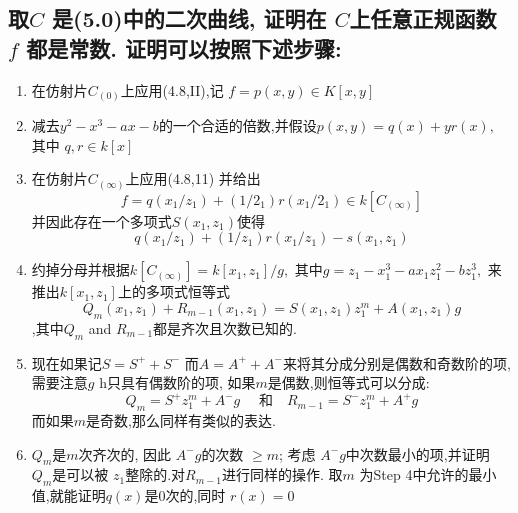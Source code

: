 \documentclass[UTF8]{book}
\begin{document}
		\subsection{取$C$ 是(5.0)中的二次曲线, 证明在 $C$上任意正规函数 $f$ 都是常数. 证明可以按照下述步骤:}
			\begin{enumerate}[Step 1]
			\item 在仿射片$C_{(0)}$上应用(4.8,II),记 $f=p(x, y) \in K [x, y]$ 
			\item 减去$y^{2}-x^{3}-a x-b$的一个合适的倍数,并假设$p(x, y)=q(x)+y r(x),$ 其中 $q, r \in k[x]$
			\item 在仿射片$C_{(\infty)}$上应用(4.8,11) 并给出
			\begin{equation*}
			f=q\left(x_{1} / z_{1}\right)+\left(1 / 2_{1}\right) r\left(x_{1} / 2_{1}\right) \in k\left[C_{(\infty)}\right]
			\end{equation*}
			并因此存在一个多项式$S\left(x_{1}, z_{1}\right)$使得
			\begin{equation*}
			q\left(x_{1} / z_{1}\right)+\left(1 / z_{1}\right) r\left(x_{1} / z_{1}\right)-s\left(x_{1}, z_{1}\right)
			\end{equation*}
			\item 约掉分母并根据$k \left[ C _{(\infty)}\right]= k \left[ x _{1}, z_{1}\right] / g ,$ 其中$g=z_{1}-x_{1}^{3}-a x_{1} z_{1}^{2}-b z_{1}^{3},$ 来推出$k \left[ x _{1}, z _{1}\right]$上的多项式恒等式
			\begin{equation*}
			Q _{ m }\left( x _{1}, z _{1}\right)+ R _{ m -1}\left( x _{1}, z _{1}\right)= S \left( x _{1}, z _{1}\right) z _{1}^{ m }+ A \left( x _{1}, z _{1}\right) g
			\end{equation*}
			,其中$Q _{ m }$ and $R _{ m -1}$都是齐次且次数已知的.
			\item 现在如果记$S=S^{+}+S^{-}$ 而$A=A^{+}+A^{-}$来将其分成分别是偶数和奇数阶的项,需要注意$g$ h只具有偶数阶的项, 如果$m$是偶数,则恒等式可以分成:
			\begin{equation*}
			Q _{ m }= S ^{+} z _{1}^{ m }+ A ^{-} g \quad \text { 和} \quad R _{ m -1}= S ^{-} z _{1}^{ m }+ A ^{+} g
			\end{equation*}
			而如果$m$是奇数,那么同样有类似的表达. 
			\item $Q_{m}$是$m$次齐次的, 因此 $A ^{-} g$的次数 $\geq m$; 考虑 $A ^{-} g$中次数最小的项,并证明 $Q _{ m }$是可以被 $z _{1}$整除的.对$R_{m-1}$进行同样的操作. 取$m$ 为Step 4中允许的最小值,就能证明$q(x)$是0次的,同时 $r(x)=0$
		\end{enumerate}
	
	
	
\end{document}
